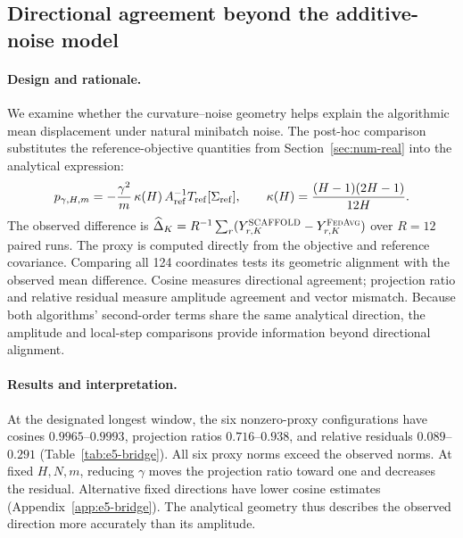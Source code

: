 \FloatBarrier

\subsection{Directional agreement beyond the additive-noise model}
\label{sec:num-directional}

\paragraph{Design and rationale.}
We examine whether the curvature--noise geometry helps explain the
algorithmic mean displacement under natural minibatch noise. The post-hoc
comparison substitutes the reference-objective quantities from
Section~\ref{sec:num-real} into the analytical expression:
\begin{equation}
\label{eq:e5-proxy}
p_{\gamma,H,m}
=-\frac{\gamma^2}{m}\,\kappa(H)\,A_{\rm ref}^{-1}T_{\rm ref}[\Sigma_{\rm ref}],
\qquad \kappa(H)=\frac{(H-1)(2H-1)}{12H}.
\end{equation}
The observed difference is
$\widehat\Delta_K=R^{-1}\sum_r(Y_{r,K}^{\textnormal{\textsc{SCAFFOLD}}}-Y_{r,K}^{\textnormal{\textsc{FedAvg}}})$
over $R=12$ paired runs. The proxy is computed directly from the objective
and reference covariance. Comparing all 124 coordinates tests its
geometric alignment with the observed mean difference. Cosine measures
directional agreement; projection ratio and relative residual measure
amplitude agreement and vector mismatch. Because both algorithms'
second-order terms share the same analytical direction, the amplitude and
local-step comparisons provide information beyond directional alignment.

\paragraph{Results and interpretation.}
At the designated longest window, the six nonzero-proxy configurations
have cosines $0.9965$--$0.9993$, projection ratios $0.716$--$0.938$, and
relative residuals $0.089$--$0.291$ (Table~\ref{tab:e5-bridge}). All six
proxy norms exceed the observed norms. At fixed $H,N,m$, reducing
$\gamma$ moves the projection ratio toward one and decreases the residual.
Alternative fixed directions have lower cosine estimates
(Appendix~\ref{app:e5-bridge}). The analytical geometry thus describes
the observed direction more accurately than its amplitude.

